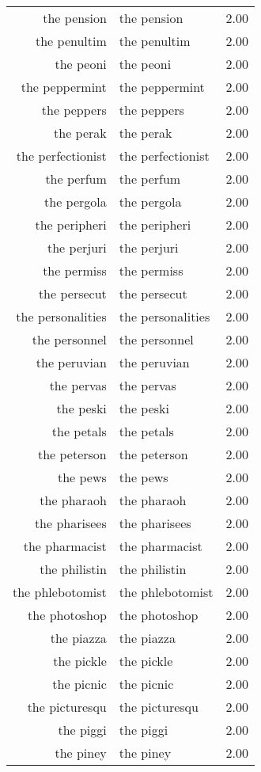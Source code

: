 \begin{table}[ht]
\begin{tabular}{rlr}
  the pension & the pension & 2.00 \\ 
  the penultim & the penultim & 2.00 \\ 
  the peoni & the peoni & 2.00 \\ 
  the peppermint & the peppermint & 2.00 \\ 
  the peppers & the peppers & 2.00 \\ 
  the perak & the perak & 2.00 \\ 
  the perfectionist & the perfectionist & 2.00 \\ 
  the perfum & the perfum & 2.00 \\ 
  the pergola & the pergola & 2.00 \\ 
  the peripheri & the peripheri & 2.00 \\ 
  the perjuri & the perjuri & 2.00 \\ 
  the permiss & the permiss & 2.00 \\ 
  the persecut & the persecut & 2.00 \\ 
  the personalities & the personalities & 2.00 \\ 
  the personnel & the personnel & 2.00 \\ 
  the peruvian & the peruvian & 2.00 \\ 
  the pervas & the pervas & 2.00 \\ 
  the peski & the peski & 2.00 \\ 
  the petals & the petals & 2.00 \\ 
  the peterson & the peterson & 2.00 \\ 
  the pews & the pews & 2.00 \\ 
  the pharaoh & the pharaoh & 2.00 \\ 
  the pharisees & the pharisees & 2.00 \\ 
  the pharmacist & the pharmacist & 2.00 \\ 
  the philistin & the philistin & 2.00 \\ 
  the phlebotomist & the phlebotomist & 2.00 \\ 
  the photoshop & the photoshop & 2.00 \\ 
  the piazza & the piazza & 2.00 \\ 
  the pickle & the pickle & 2.00 \\ 
  the picnic & the picnic & 2.00 \\ 
  the picturesqu & the picturesqu & 2.00 \\ 
  the piggi & the piggi & 2.00 \\ 
  the piney & the piney & 2.00 \\ 

\end{tabular}
\end{table}
